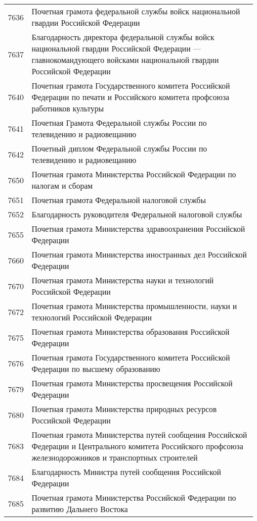 \documentclass[10pt, a4paper, titlepage]{article}
\begin{document}
\begin{center}
\begin{longtable}{rp{}}
        7636 & Почетная грамота федеральной службы войск национальной гвардии Российской Федерации \\
        7637 & Благодарность директора федеральной службы войск национальной гвардии Российской Федерации — главнокомандующего войсками национальной гвардии Российской Федерации \\
        7640 & Почетная грамота Государственного комитета Российской Федерации по печати и Российского комитета профсоюза работников культуры \\
        7641 & Почетная Грамота Федеральной службы России по телевидению и радиовещанию \\
        7642 & Почетный диплом Федеральной службы России по телевидению и радиовещанию \\
        7650 & Почетная грамота Министерства Российской Федерации по налогам и сборам \\
        7651 & Почетная грамота Федеральной налоговой службы \\
        7652 & Благодарность руководителя Федеральной налоговой службы \\
        7655 & Почетная грамота Министерства здравоохранения Российской Федерации \\
        7660 & Почетная грамота Министерства иностранных дел Российской Федерации \\
        7670 & Почетная грамота Министерства науки и технологий Российской Федерации \\
        7672 & Почетная грамота Министерства промышленности, науки и технологий Российской Федерации \\
        7675 & Почетная грамота Министерства образования Российской Федерации \\
        7676 & Почетная грамота Государственного комитета Российской Федерации по высшему образованию \\
        7679 & Почетная грамота Министерства просвещения Российской Федерации \\
        7680 & Почетная грамота Министерства природных ресурсов Российской Федерации \\
        7683 & Почетная грамота Министерства путей сообщения Российской Федерации и Центрального комитета Российского профсоюза железнодорожников и транспортных строителей \\
        7684 & Благодарность Министра путей сообщения Российской Федерации \\
        7685 & Почетная грамота Министерства Российской Федерации по развитию Дальнего Востока \\

\end{longtable}
\end{center}
\end{document}
